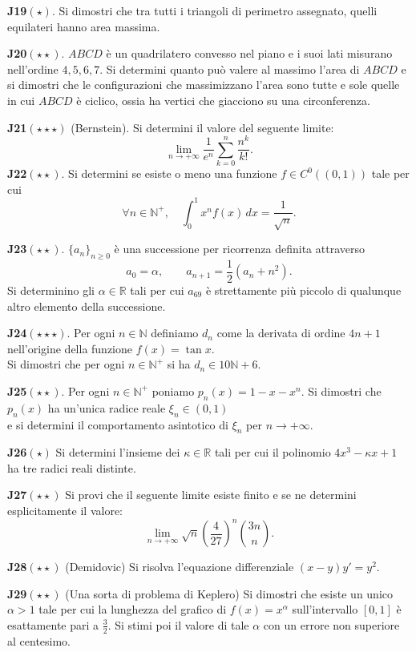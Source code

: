 \documentclass[a4paper,twoside]{article}
\theoremstyle{definition}
\numberwithin{theorem}{section}
\begin{document}
\textbf{J19}$(\star)$. Si dimostri che tra tutti i triangoli di perimetro assegnato, quelli equilateri hanno area massima. 

\textbf{J20}$(\star\star)$. $ABCD$ è un quadrilatero convesso nel piano e i suoi lati misurano nell'ordine $4,5,6,7$. Si determini quanto può valere al massimo l'area di $ABCD$ e si dimostri che le configurazioni che massimizzano l'area sono tutte e sole quelle in cui $ABCD$ è ciclico, ossia ha vertici che giacciono su una circonferenza.

\textbf{J21}$(\star\star\star)$ (Bernstein). Si determini il valore del seguente limite: 
$$ \lim_{n\to +\infty} \frac{1}{e^n}\sum_{k=0}^{n}\frac{n^k}{k!}.$$
\textbf{J22}$(\star\star)$. Si determini se esiste o meno una funzione $f\in C^0((0,1))$ tale per cui
$$ \forall n\in\mathbb{N}^+,\quad \int_{0}^{1} x^n f(x)\,dx = \frac{1}{\sqrt{n}}. $$

\textbf{J23}$(\star\star)$. $\{a_n\}_{n\geq 0}$ è una successione per ricorrenza definita attraverso
$$ a_0=\alpha,\qquad a_{n+1} = \frac{1}{2}\left(a_n+n^2\right).$$
Si determinino gli $\alpha\in\mathbb{R}$ tali per cui $a_{69}$ è strettamente più piccolo di qualunque altro elemento della successione. 

\textbf{J24}$(\star\star\star)$. Per ogni $n\in\mathbb{N}$ definiamo $d_n$ come la derivata di ordine $4n+1$ nell'origine della funzione $f(x)=\tan x$.\\ Si dimostri che per ogni $n\in\mathbb{N}^+$ si ha $d_n \in 10\mathbb{N}+6$.

\textbf{J25}$(\star\star)$. Per ogni $n\in\mathbb{N}^+$ poniamo $p_n(x)=1-x-x^n$. Si dimostri che $p_n(x)$ ha un'unica radice reale $\xi_n\in (0,1)$\\ e si determini il comportamento asintotico di $\xi_n$ per $n\to +\infty$. 

\textbf{J26}$(\star)$ Si determini l'insieme dei $\kappa\in\mathbb{R}$ tali per cui il polinomio $4x^3-\kappa x+1$ ha tre radici reali distinte.

\textbf{J27}$(\star\star)$ Si provi che il seguente limite esiste finito e se ne determini esplicitamente il valore:
$$ \lim_{n\to +\infty} \sqrt{n}\left(\frac{4}{27}\right)^n \binom{3n}{n}. $$

\textbf{J28}$(\star\star)$ (Demidovic) Si risolva l'equazione differenziale $(x-y)y'=y^2$.

\textbf{J29}$(\star\star)$ (Una sorta di problema di Keplero) Si dimostri che esiste un unico $\alpha > 1$ tale per cui la lunghezza del grafico di $f(x)=x^{\alpha}$ sull'intervallo $[0,1]$ è esattamente pari a $\frac{3}{2}$. Si stimi poi il valore di tale $\alpha$ con un errore non superiore al centesimo.
\end{document}
